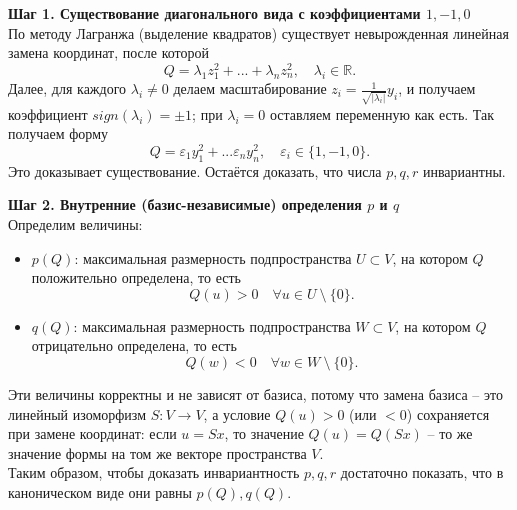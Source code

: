 \documentclass[14pt]{extreport}
\begin{document}
    \begin{prbox}
        \textbf{Шаг 1. Существование диагонального вида с коэффициентами $1, -1, 0$}\\
        По методу Лагранжа (выделение квадратов) существует невырожденная линейная замена координат, после которой
        \[
        Q = \lambda_1z_1^2 + ... + \lambda_nz_n^2, \quad \lambda_i \in \mathbb{R}.
        \]
        Далее, для каждого $\lambda_i \neq 0$ делаем масштабирование $z_i = \frac{1}{\sqrt{|\lambda_i|}}y_i$, и получаем коэффициент $sign(\lambda_i) = \pm 1$; при $\lambda_i=0$ оставляем переменную как есть. Так получаем форму
        \[
        Q = \varepsilon_1y_1^2 + ... \varepsilon_ny_n^2, \quad \varepsilon_i \in \{ 1,-1,0 \}.
        \]
        Это доказывает существование. Остаётся доказать, что числа $p,q,r$ инвариантны.

        \textbf{Шаг 2. Внутренние (базис-независимые) определения $p$ и $q$}\\
        Определим величины:
        \begin{itemize}
            \item $p(Q)$: максимальная размерность подпространства $U \subset V$, на котором $Q$ положительно определена, то есть
            \[
            Q(u) > 0 \quad \forall u \in U\ \setminus\ \{0\}.
            \]
            \item $q(Q)$: максимальная размерность подпространства $W \subset V$, на котором $Q$ отрицательно определена, то есть
            \[
            Q(w) < 0 \quad \forall w \in W\ \setminus\ \{0\}.
            \]
        \end{itemize}
        Эти величины корректны и не зависят от базиса, потому что замена базиса – это линейный изоморфизм $S: V \rightarrow V$, а условие $Q(u) > 0$ (или $<0$) сохраняется при замене координат: если $u = Sx$, то значение $Q(u) = Q(Sx)$ – то же значение формы на том же векторе пространства $V$.\\
        Таким образом, чтобы доказать инвариантность $p,q,r$ достаточно показать, что в каноническом виде они равны $p(Q), q(Q)$.


\end{prbox}
\end{document}
